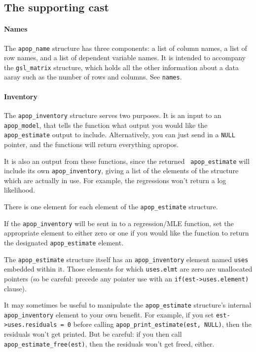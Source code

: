 \subsection{The supporting cast}
\paragraph{Names}
The {\tt apop\_name} structure has three components: a list of column
names, a list of row names, and a list of dependent variable names. It
is intended to accompany the {\tt gsl\_matrix} structure, which holds
all the other information about a data aaray such as the number of rows
and columns.  See {\tt names}.

\paragraph{Inventory}
The {\tt apop\_inventory} structure serves two purposes. It is an input
to an {\tt apop\_\-model}, that tells the function what output you
would like the {\tt apop\_\-estimate} output to include.  Alternatively, you
can just send in a {\tt NULL} pointer, and the functions will return
everything apropos.

It is also an output from these functions, since the returned {\tt
apop\_\-estimate} will include its own {\tt apop\_\-in\-ventory},
giving a list of the elements of the structure which are
actually in use. For example, the regressions won't return a log
likelihood.

There is one element for each element of the {\tt apop\_estimate} structure.

If the {\tt apop\_inventory} will be sent in to a regression/MLE
function, set the appropriate element to either zero or one if you would
like the function to return the designated {\tt apop\_estimate} element.

The {\tt apop\_estimate} structure itself has an {\tt apop\_inventory}
element named {\tt uses} embedded within it. Those elements for
which {\tt uses.elmt} are zero are unallocated pointers (so be careful:
precede any pointer use with an {\tt if(est->uses.element)} clause).

It may sometimes be useful to manipulate the {\tt apop\_estimate} structure's
internal {\tt apop\_\-inventory} element to your own benefit. For
example, if you set {\tt est->uses.residuals = 0} before calling
{\tt apop\_\-print\_\-estimate(est, NULL)}, then the residuals won't get
printed. But be careful: if you then call {\tt apop\_\-estimate\_\-free(est)},
then the residuals won't get freed, either.

